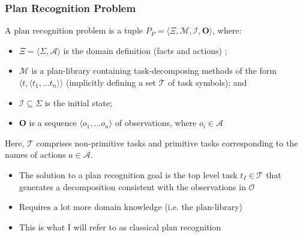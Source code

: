 \documentclass{beamer}
\begin{document}
	\begin{frame}[c]\frametitle{Plan Recognition Problem}
		\begin{definition}
			A plan recognition problem is a tuple $P_{P} = \langle \Xi, \mathcal{M}, \mathcal{I}, \mathbf{O} \rangle$, where:
	       	\begin{itemize}
	       		\item $\Xi = \langle \Sigma, \mathcal{A} \rangle$ is the domain definition (facts and actions) ;
				\item $\mathcal{M}$ is a plan-library containing task-decomposing methods of the form $\langle t, \langle t_1, \dots t_n \rangle \rangle$ (implicitly defining a set $\mathcal{T}$ of task symbols); and
	       		\item $\mathcal{I} \subseteq \Sigma$ is the initial state;
	       		\item $\mathbf{O}$ is a sequence $\langle o_1, \dots o_n \rangle$ of observations, where $o_i \in \mathcal{A}$
	       	\end{itemize}
			Here, $\mathcal{T}$ comprises non-primitive tasks and primitive tasks corresponding to the names of actions $a \in \mathcal{A}$.
		\end{definition}
		
		\begin{itemize}
			\item The solution to a plan recognition goal is the top level task $t_{I} \in \mathcal{T}$ that generates a decomposition consistent with the observations in $\mathcal{O}$
			\item Requires a lot more domain knowledge (i.e. the plan-library)
			\item This is what I will refer to as classical plan recognition 
		\end{itemize}
	\end{frame}
	
	
\end{document}
